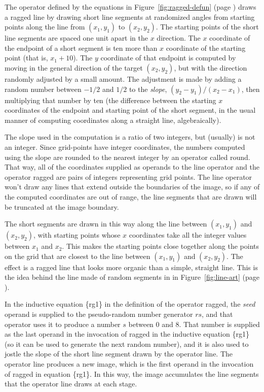 The operator defined by the equations in
Figure~\ref{fig:ragged-defun} (page \pageref{fig:ragged-defun})
draws a ragged line
by drawing short line segments at randomized angles
from starting points along the line from $(x_1,y_1)$ to $(x_2,y_2)$.
The starting points of the short line segments are
spaced one unit apart in the $x$ direction.
The $x$ coordinate of the endpoint of a short segment
is ten more than $x$ coordinate of the starting point
(that is, $x_1 + 10$).
The $y$ coordinate of that endpoint is computed
by moving in the general direction of the target
$(x_2,y_2)$, but with the direction
randomly adjusted by a small amount.
The adjustment is made by adding a random number between
$-1/2$ and $1/2$ to the \emph{slope},
$(y_2 - y_1)/(x_2 - x_1)$, then multiplying that
number by ten (the difference between the
starting $x$ coordinates of the endpoint
and starting point of the short segment,
in the usual manner of computing coordinates
along a straight line, algebraically).

The slope used in the computation is a ratio of
two integers, but (usually) is not an integer.
Since grid-points have integer coordinates,
the numbers computed using the slope
are rounded to the nearest integer by
an operator called \textsf{round}. That way,
all of the coordinates supplied as
operands to the \textsf{line} operator
and the operator \textsf{ragged} are pairs of
integers representing grid points.
The \textsf{line} operator won't draw any lines
that extend outside the boundaries of
the image, so if any of the computed
coordinates are out of range,
the line segments that are drawn will
be truncated at the image boundary.

The short segments are drawn in this way along
the line between $(x_1,y_1)$ and $(x_2,y_2)$,
with starting points whose $x$ coordinates
take all the integer values between $x_1$ and $x_2$.
This makes the starting points close together along
the points on the grid that are closest to the
line between $(x_1,y_1)$ and $(x_2,y_2)$.
The effect is a ragged line that looks more organic
than a simple, straight line.
This is the idea behind the line made of random segments in
in Figure~\ref{fig:line-art} (page \pageref{fig:line-art}).

In the inductive equation \{rg1\} in the definition of the operator \textsf{ragged},
the \emph{seed} operand is supplied to the pseudo-random
number generator $rs$, and that operator uses it to produce
a number $s$ between 0 and 8. That number is supplied as the last
operand in the invocation of \textsf{ragged} in the inductive equation \{rg1\}
(so it can be used to generate the next random number),
and it is also used to jostle
the slope of the short line segment drawn by the operator \textsf{line}.
The operator \textsf{line} produces a new image,
which is the first operand in the invocation of \textsf{ragged} in equation \{rg1\}.
In this way, the image accumulates the line segments that the operator \textsf{line}
draws at each stage.

